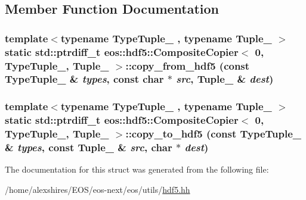 \subsection{Member Function Documentation}
\hypertarget{structeos_1_1hdf5_1_1CompositeCopier_3_010_00_01TypeTuple___00_01Tuple___01_4_ad4f925fa6486662bc95b459a95ac4c02}{
\subsubsection[{copy\_\-from\_\-hdf5}]{\setlength{\rightskip}{0pt plus 5cm}template$<$typename TypeTuple\_\- , typename Tuple\_\- $>$ static std::ptrdiff\_\-t {\bf eos::hdf5::CompositeCopier}$<$ 0, TypeTuple\_\-, Tuple\_\- $>$::copy\_\-from\_\-hdf5 (const TypeTuple\_\- \& {\em types}, \/  const char $\ast$ {\em src}, \/  Tuple\_\- \& {\em dest})}}
\label{structeos_1_1hdf5_1_1CompositeCopier_3_010_00_01TypeTuple___00_01Tuple___01_4_ad4f925fa6486662bc95b459a95ac4c02}
\hypertarget{structeos_1_1hdf5_1_1CompositeCopier_3_010_00_01TypeTuple___00_01Tuple___01_4_a2f1615908f9dc922402fd137d5c8ee76}{
\subsubsection[{copy\_\-to\_\-hdf5}]{\setlength{\rightskip}{0pt plus 5cm}template$<$typename TypeTuple\_\- , typename Tuple\_\- $>$ static std::ptrdiff\_\-t {\bf eos::hdf5::CompositeCopier}$<$ 0, TypeTuple\_\-, Tuple\_\- $>$::copy\_\-to\_\-hdf5 (const TypeTuple\_\- \& {\em types}, \/  const Tuple\_\- \& {\em src}, \/  char $\ast$ {\em dest})}}
\label{structeos_1_1hdf5_1_1CompositeCopier_3_010_00_01TypeTuple___00_01Tuple___01_4_a2f1615908f9dc922402fd137d5c8ee76}


The documentation for this struct was generated from the following file:\begin{DoxyCompactItemize}
\item 
/home/alexshires/EOS/eos-\/next/eos/utils/\hyperlink{hdf5_8hh}{hdf5.hh}\end{DoxyCompactItemize}
